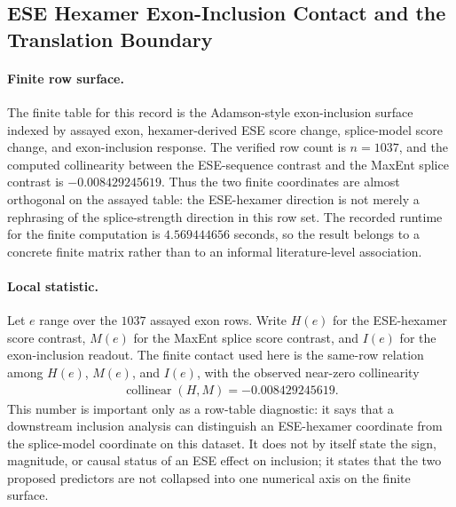 \subsection{ESE Hexamer Exon-Inclusion Contact and the Translation Boundary}
\label{sec:bioreality-ese-hexamer-exon-inclusion-adamson2018}

\paragraph{Finite row surface.}
The finite table for this record is the Adamson-style exon-inclusion surface indexed by assayed exon, hexamer-derived ESE score change, splice-model score change, and exon-inclusion response.  The verified row count is $n=1037$, and the computed collinearity between the ESE-sequence contrast and the MaxEnt splice contrast is $-0.008429245619$.  Thus the two finite coordinates are almost orthogonal on the assayed table: the ESE-hexamer direction is not merely a rephrasing of the splice-strength direction in this row set.  The recorded runtime for the finite computation is $4.569444656$ seconds, so the result belongs to a concrete finite matrix rather than to an informal literature-level association.

\paragraph{Local statistic.}
Let $e$ range over the $1037$ assayed exon rows.  Write $H(e)$ for the ESE-hexamer score contrast, $M(e)$ for the MaxEnt splice score contrast, and $I(e)$ for the exon-inclusion readout.  The finite contact used here is the same-row relation among $H(e)$, $M(e)$, and $I(e)$, with the observed near-zero collinearity
$$
\begin{aligned}
\operatorname{collinear}(H,M) = -0.008429245619.
\end{aligned}
$$
This number is important only as a row-table diagnostic: it says that a downstream inclusion analysis can distinguish an ESE-hexamer coordinate from the splice-model coordinate on this dataset.  It does not by itself state the sign, magnitude, or causal status of an ESE effect on inclusion; it states that the two proposed predictors are not collapsed into one numerical axis on the finite surface.

